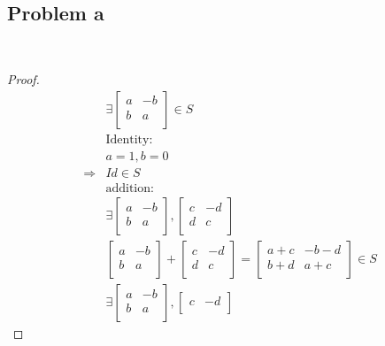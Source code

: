 \documentclass{article}
\begin{document}
~

\subsection*{Problem a}

~

\begin{proof}
    \begin{align*}
        &\exists \begin{bmatrix}
            a&-b\\
            b&a\\
        \end{bmatrix}\in S\\
        &\text{Identity}:\\
        &a=1,b=0\\
        \Rightarrow&Id\in S\\
        &\text{addition}:\\
        &\exists\begin{bmatrix}
            a&-b\\
            b&a\\
        \end{bmatrix},\begin{bmatrix}
            c&-d\\
            d&c\\
        \end{bmatrix}\\
        &\begin{bmatrix}
            a&-b\\
            b&a\\
        \end{bmatrix}+\begin{bmatrix}
            c&-d\\
            d&c\\
        \end{bmatrix}=\begin{bmatrix}
            a+c&-b-d\\
            b+d&a+c\\
        \end{bmatrix}\in S\\
        &\exists\begin{bmatrix}
            a&-b\\
            b&a\\
        \end{bmatrix},\begin{bmatrix}
            c&-d\\

\end{bmatrix}
\end{align*}
\end{proof}
\end{document}
